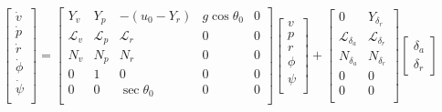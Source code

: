 \documentclass{article}
\begin{document}
\begin{equation} \label{Eq:Linearized_sys}
    \begin{bmatrix}
    \dot{v} \\
    \dot{p} \\
    \dot{r} \\
    \dot{\phi} \\
    \dot{\psi} \\
    \end{bmatrix}
    =
    \begin{bmatrix}
    Y_v & Y_p & -(u_0 - Y_r) & g \cos{\theta_0} & 0\\
    \mathcal{L}_v & \mathcal{L}_p & \mathcal{L}_r & 0 & 0\\
    N_v & N_p & N_r & 0 & 0\\
    0 & 1 & 0 & 0 & 0\\
    0 & 0 & \sec{\theta_0} & 0 & 0\\
    \end{bmatrix}
    \begin{bmatrix}
    v\\
    p\\
    r\\
    \phi\\
    \psi\\ 	
    \end{bmatrix}
    +
    \begin{bmatrix}
    0 & Y_{\delta_r} \\
    \mathcal{L}_{\delta_a} & \mathcal{L}_{\delta_r} \\
    N_{\delta_a} & N_{\delta_r} \\
    0 & 0\\
    0 & 0\\ 	
    \end{bmatrix}
    \begin{bmatrix}
    {\delta_a} \\
    {\delta_r}  	
    \end{bmatrix}
\end{equation}
\end{document}
